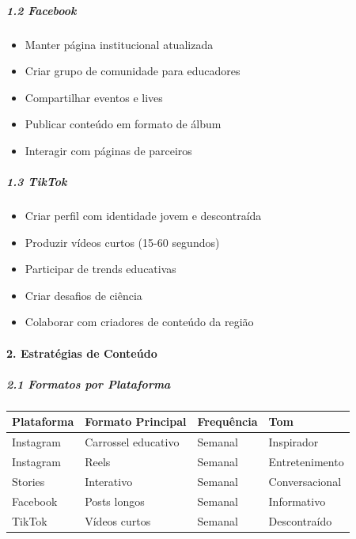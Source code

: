 \subparagraph{1.2 Facebook}

\begin{itemize}
\item[$\square$] Manter página institucional atualizada
\item[$\square$] Criar grupo de comunidade para educadores
\item[$\square$] Compartilhar eventos e lives
\item[$\square$] Publicar conteúdo em formato de álbum
\item[$\square$] Interagir com páginas de parceiros
\end{itemize}

\subparagraph{1.3 TikTok}

\begin{itemize}
\item[$\square$] Criar perfil com identidade jovem e descontraída
\item[$\square$] Produzir vídeos curtos (15-60 segundos)
\item[$\square$] Participar de trends educativas
\item[$\square$] Criar desafios de ciência
\item[$\square$] Colaborar com criadores de conteúdo da região
\end{itemize}

\paragraph{2. Estratégias de Conteúdo}

\subparagraph{2.1 Formatos por Plataforma}

\bigskip\noindent
\begin{tabular}{p{}p{}p{}p{}}
\toprule
Plataforma & Formato Principal & Frequência & Tom \\
\hline
Instagram & Carrossel educativo & Semanal & Inspirador \\
Instagram & Reels & Semanal & Entretenimento \\
Stories & Interativo & Semanal & Conversacional \\
Facebook & Posts longos & Semanal & Informativo \\
TikTok & Vídeos curtos & Semanal & Descontraído \\
\bottomrule
\end{tabular}

